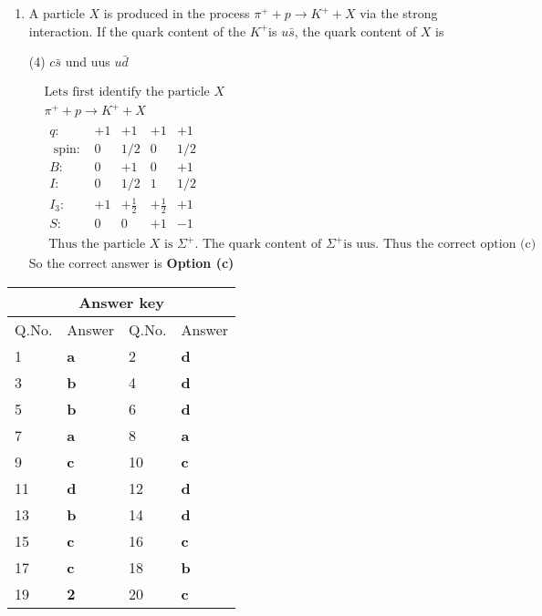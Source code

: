 \begin{enumerate}
	\item  A particle $X$ is produced in the process $\pi^{+}+p \rightarrow K^{+}+X$ via the strong interaction. If the quark content of the $K^{+}$is $u \bar{s}$, the quark content of $X$ is
	{}
	\begin{tasks}(4)
		\task[\textbf{a.}]$c \bar{s}$
		\task[\textbf{b.}]und
		\task[\textbf{c.}]uus
		\task[\textbf{d.}]$u \bar{d}$ 
	\end{tasks}
	\begin{answer}
		\begin{align*}
		&\text{Lets first identify the particle $X$}\\
		&\pi^{+}+p \rightarrow K^{+}+X\\
		&\begin{array}{lllll}
		q:& +1&+1&+1&+1\\
		\text { spin: } & 0 & 1 / 2 & 0 & 1 / 2\\
		B:&  0&+1&  0&+1\\
		I: &0 &1 / 2& 1 & 1 / 2\\
		I_3: &+1&+\frac{1}{2}&+\frac{1}{2}&+1\\
		S:&  0 & 0 &+1&-1
		\end{array}\\
		&\text { Thus the particle } X \text { is } \Sigma^{+} \text {. The quark content of } \Sigma^{+} \text {is uus. Thus the correct option (c) }
		\end{align*}
		So the correct answer is \textbf{Option (c)}
	\end{answer}
\end{enumerate}
\setlength\arrayrulewidth{1pt}
\begin{table}[H]
	\centering
	\begin{tabular}{|p{1.5cm}|p{1.5cm}||p{1.5cm}|p{1.5cm}|}
		\hline
		\multicolumn{4}{|c|}{\textbf{Answer key}}\\\hline\hline
		\rowcolor{ocrel}Q.No.&Answer&Q.No.&Answer\\\hline
		1&\textbf{a} &2&\textbf{d}\\\hline 
		3&\textbf{b} &4&\textbf{d} \\\hline
		5&\textbf{b} &6&\textbf{d} \\\hline
		7&\textbf{a}&8&\textbf{a}\\\hline
		9&\textbf{c}&10&\textbf{c}\\\hline
		11&\textbf{d} &12&\textbf{d}\\\hline
		13&\textbf{b}&14&\textbf{d}\\\hline
		15&\textbf{c}&16&\textbf{c} \\\hline
		17&\textbf{c}&18&\textbf{b}\\\hline
		19&\textbf{2}&20&\textbf{c}\\\hline
	\end{tabular}
\end{table}